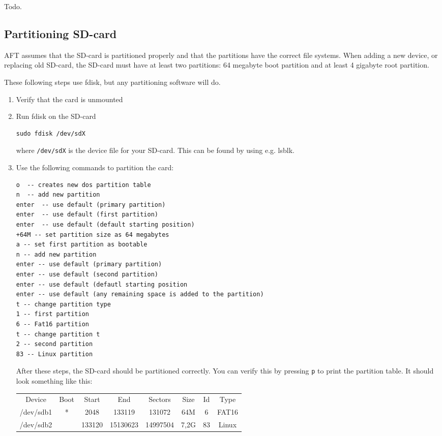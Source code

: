 \documentclass[a4paper,11pt]{article}
\newcommand{\cmd}[1]{\texttt{#1}}
\begin{document}
Todo.

\subsection{Partitioning SD-card}
\label{part_sd}
AFT assumes that the SD-card is partitioned properly and that the partitions have the correct file systems. When adding a new device, or replacing old SD-card, the SD-card must have at least two partitions: 64 megabyte boot partition and at least 4 gigabyte root partition.

These following steps use fdisk, but any partitioning software will do.

\begin{enumerate}

\item Verify that the card is unmounted

\item Run fdisk on the SD-card

\begin{lstlisting}
sudo fdisk /dev/sdX
\end{lstlisting} 

where \cmd{/dev/sdX} is the device file for your SD-card. This can be found by using e.g. lsblk.

\item Use the following commands to partition the card:

\begin{lstlisting}
o  -- creates new dos partition table
n  -- add new partition
enter  -- use default (primary partition)
enter  -- use default (first partition)
enter  -- use default (default starting position)
+64M -- set partition size as 64 megabytes
a -- set first partition as bootable
n -- add new partition
enter -- use default (primary partition)
enter -- use default (second partition)
enter -- use default (defautl starting position
enter -- use default (any remaining space is added to the partition)
t -- change partition type
1 -- first partition 
6 -- Fat16 partition
t -- change partition t
2 -- second partition 
83 -- Linux partition
\end{lstlisting}

After these steps, the SD-card should be partitioned correctly. You can verify this by pressing \cmd{p} to print the partition table. It should look something like this:

\begin{tabular}{c c c c c c c c}
Device & Boot & Start & End & Sectors & Size & Id & Type \\
/dev/sdb1  & * & 2048 & 133119 & 131072 & 64M & 6 & FAT16 \\
/dev/sdb2  &   & 133120 & 15130623 & 14997504 & 7,2G & 83 & Linux \\
\end{tabular}


\end{enumerate}
\end{document}
